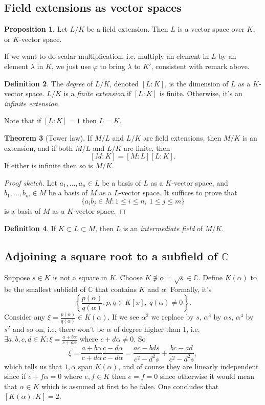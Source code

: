 \documentclass[a4paper]{article}
\newcommand{\C}{\mathbb C}
\theoremstyle{definition}
\newtheorem{defn}{Definition}[subsection]
\newtheorem{prop}[defn]{Proposition}
\newtheorem{thm}[defn]{Theorem}
\begin{document}
\subsection{Field extensions as vector spaces}
\begin{prop}
Let $L/K$ be a field extension. Then $L$ is a vector space over $K$, or $K$-vector space.
\end{prop}
If we want to do scalar multiplication, i.e. multiply an element in $L$ by an element $\lambda$ in $K$, we just use $\varphi$ to bring $\lambda$ to $K'$, consistent with remark above.
\begin{defn}
The \textit{degree} of $L/K$, denoted $[L:K]$, is the dimension of $L$ as a $K$-vector space. $L/K$ is a \textit{finite extension} if $[L:K]$ is finite. Otherwise, it's an \textit{infinite extension}.
\end{defn}
Note that if $[L:K]=1$ then $L=K$.
\begin{thm}[Tower law]
If $M/L$ and $L/K$ are field extensions, then $M/K$ is an extension, and if both $M/L$ and $L/K$ are finite, then
\[
[M:K]=[M:L][L:K].
\]
If either is infinite then so is $M/K$.
\end{thm}
\begin{proof}[Proof sketch]
Let $a_1,\ldots ,a_n\in L$ be a basis of $L$ as a $K$-vector space, and $b_1,\ldots ,b_m\in M$ be a basis of $M$ as a $L$-vector space. It suffices to prove that
\[
\{a_i b_j\in M:1\leq i\leq n,\ 1\leq j\leq m\}
\]
is a basis of $M$ as a $K$-vector space.
\end{proof}
\begin{defn}
If $K\subset L\subset M$, then $L$ is an \textit{intermediate field} of $M/K$.
\end{defn}

\subsection{Adjoining a square root to a subfield of $\C$}
Suppose $s\in K$ is not a square in $K$. Choose $K\not\ni\alpha=\sqrt{s}\in\C$. Define $K(\alpha)$ to be the smallest subfield of $\C$ that contains $K$ and $\alpha$. Formally, it's
\[
\left\{\frac{p(\alpha)}{q(\alpha)}:p,q\in K[x],\ q(\alpha)\neq 0\right\}.
\]
Consider any $\displaystyle \xi=\frac{p(\alpha)}{q(\alpha)}\in K(\alpha)$. If we see $\alpha^2$ we replace by $s$, $\alpha^3$ by $\alpha s$, $\alpha^4$ by $s^2$ and so on, i.e. there won't be $\alpha$ of degree higher than 1, i.e. $\displaystyle \exists a,b,c,d\in K:\xi=\frac{a+b\alpha}{c+d\alpha}$ where $c+d\alpha\neq 0$. So
\[
\xi = \frac{a+b\alpha}{c+d\alpha}\frac{c-d\alpha}{c-d\alpha}=\frac{ac-bds}{c^2-d^2s}+\frac{bc-ad}{c^2-d^2s},
\]
which tells us that $1,\alpha$ span $K(\alpha)$, and of course they are linearly independent since if $e+f\alpha=0$ where $e,f\in K$ then $e=f=0$ since otherwise it would mean that $\alpha\in K$ which is assumed at first to be false. One concludes that $[K(\alpha):K]=2$.
\end{document}
